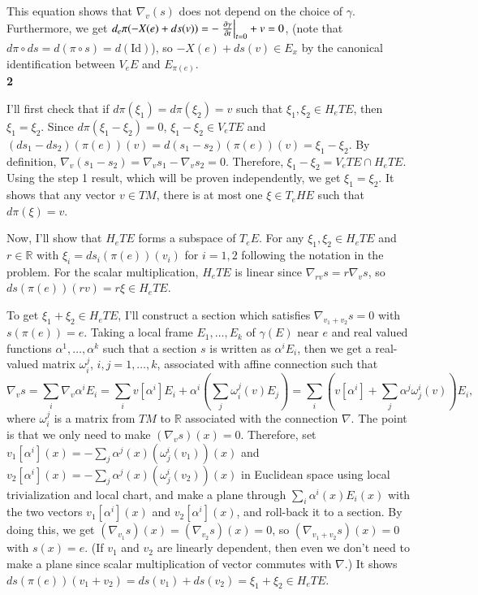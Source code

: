\documentclass[a4paper, 12pt]{article}
\theoremstyle{Mydefinition}
\theoremstyle{Mytheorem}
\begin{document}
This equation shows that $\nabla_v(s)$ does not depend on the choice of $\gamma$. Furthermore, we get $d_e\pi(-X(e)+ds(v)) = -\left.\pdv{\gamma}{t}\right|_{t=0} + v = 0$, (note that $d\pi\circ ds = d(\pi\circ s) = d(\textrm{Id})$), so $-X(e)+ds(v) \in E_{x}$ by the canonical identification between $V_eE$ and $E_{\pi(e)}$.\\




\noindent \textbf{2}

I'll first check that if $d\pi(\xi_1) = d\pi(\xi_2) = v$ such that $\xi_1,\xi_2\in H_eTE$, then $\xi_1=\xi_2$. Since $d\pi(\xi_1-\xi_2) = 0$, $\xi_1-\xi_2 \in V_eTE$ and $(ds_1-ds_2)(\pi(e))(v) = d(s_1-s_2)(\pi(e))(v) = \xi_1-\xi_2$. By definition, $\nabla_v (s_1-s_2) = \nabla_v s_1-\nabla_v s_2 = 0$. Therefore, $\xi_1-\xi_2 = V_eTE\cap H_eTE$. Using the step 1 result, which will be proven independently, we get $\xi_1 = \xi_2$. It shows that any vector $v\in TM$, there is at most one $\xi\in T_eHE$ such that $d\pi(\xi) = v$.

Now, I'll show that $H_eTE$ forms a subspace of $T_eE$. For any $\xi_1, \xi_2\in H_eTE$ and $r\in \mathbb{R}$ with $\xi_i = ds_i(\pi(e))(v_i)$ for $i=1,2$ following the notation in the problem. For the scalar multiplication, $H_eTE$ is linear since $\nabla_{r v} s = r \nabla_{v} s$, so $ds(\pi(e))(rv) = r\xi\in H_eTE$. 

To get $\xi_1+\xi_2\in H_eTE$, I'll construct a section which satisfies $\nabla_{v_1+v_2} s = 0$ with $s(\pi(e)) = e$. Taking a local frame $E_1, \ldots, E_k$ of $\gamma(E)$ near $e$ and real valued functions $\alpha^1, \ldots, \alpha^k$ such that a section $s$ is written as $\alpha^i E_i$, then we get a real-valued matrix $\omega_i^j$, $i,j=1,\ldots, k$, associated with affine connection such that
\begin{equation}\label{Eq:2_1}
    \nabla_v s = \sum_i \nabla_v \alpha^i E_i = \sum_i v[\alpha^i]E_i + \alpha^i(\sum_j \omega^j_i(v)E_j)  = \sum_i (v[\alpha^i] + \sum_j \alpha^j \omega^i_j(v) )E_i,
\end{equation}
where $\omega^j_i$ is a matrix from $TM$ to $\mathbb{R}$ associated with the connection $\nabla$. The point is that we only need to make $(\nabla_v s)(x) = 0$. Therefore, set $v_1[\alpha^i](x) = -\sum_j \alpha^j(x)(\omega_j^i(v_1))(x)$ and $v_2[\alpha^i](x) = -\sum_j \alpha^j(x)(\omega_j^i(v_2))(x)$ in Euclidean space using local trivialization and local chart, and make a plane through $\sum_i \alpha^i(x)E_i(x)$ with the two vectors $v_1[\alpha^i](x)$ and $v_2[\alpha^i](x)$, and roll-back it to a section. By doing this, we get $(\nabla_{v_1}s)(x) = (\nabla_{v_2} s)(x) = 0$, so $(\nabla_{v_1+v_2}s)(x) = 0$ with $s(x) = e$. (If $v_1$ and $v_2$ are linearly dependent, then even we don't need to make a plane since scalar multiplication of vector commutes with $\nabla$.) It shows $ds(\pi(e))(v_1+v_2) = ds(v_1)+ds(v_2) = \xi_1+\xi_2\in H_eTE$.
\end{document}
